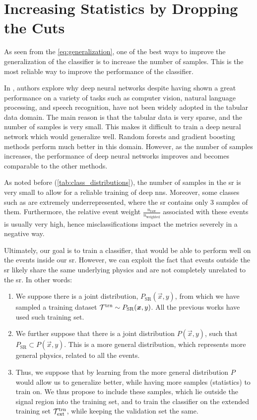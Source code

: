 \section{Increasing Statistics by Dropping the Cuts}
\label{sec:extended-set}

As seen from the \autoref{eq:generalization}, one of the best ways to improve the generalization of the classifier is to
increase the number of samples. This is the most reliable way to improve the performance of the classifier.

In \cite{tabular}, authors explore why deep neural networks despite having shown a great performance on a variety of
tasks such as computer vision, natural language processing, and speech recognition, have not been widely adopted in the
tabular data domain. The main reason is that the tabular data is very sparse, and the number of samples is very small.
This makes it difficult to train a deep neural network which would generalize well. Random forests and gradient boosting
methods perform much better in this domain. However, as the number of samples increases, the performance of deep neural
networks improves and becomes comparable to the other methods.

As noted before (\autoref{tab:class_distributions}), the number of samples in the \gls{sr} is very small to allow
for a reliable training of deep \glspl{nn}. Moreover, some classes such as \ttbar are extremely underrepresented,
where the \gls{sr} contains only 3 samples of them. Furthermore, the relative event weight
$\frac{n_\text{raw}}{n_\text{weighted}}$ associated with these events is usually very high, hence misclassifications
impact the metrics severely in a negative way.

Ultimately, our goal is to train a classifier, that would be able to perform well on the events inside our \gls{sr}.
However, we can exploit the fact that events outside the \gls{sr} likely share the same underlying physics and are not
completely unrelated to the \gls{sr}. In other words:

\begin{enumerate}
    \item We suppose there is a joint distribution, $P_\text{SR}(\vec{x}, y)$, from which we have sampled a
          training dataset $\mathcal{T}^\text{trn} \sim P_\text{SR}({\boldsymbol{x}}, y)$. All the previous works have used such training set.
    \item We further suppose that there is a joint distribution $P(\vec{x}, y)$, such that $P_\text{SR} \subset
              P(\vec{x}, y)$. This is a more general distribution, which represents more general physics, related to
          all the events.
    \item Thus, we suppose that by learning from the more general distribution $P$ would allow us to generalize
          better, while having more samples (statistics) to train on. We thus propose to include these samples, which
          lie outside the signal region into the training set, and to train the classifier on the extended training set
          $\mathcal{T}^\text{trn}_\text{ext}$, while keeping the validation set the same.
\end{enumerate}

